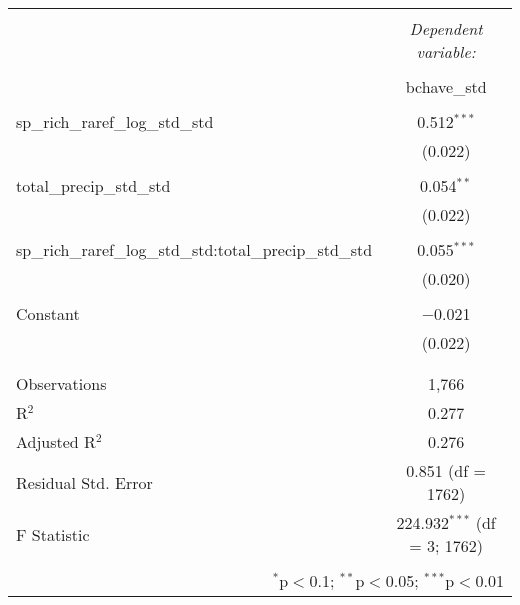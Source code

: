 
\begin{table}[!htbp] \centering 
  \caption{} 
  \label{mois_div_int_mod} 
\begin{tabular}{@{\extracolsep{5pt}}lc} 
\\[-1.8ex]\hline 
\hline \\[-1.8ex] 
 & \multicolumn{1}{c}{\textit{Dependent variable:}} \\ 
\cline{2-2} 
\\[-1.8ex] & bchave\_std \\ 
\hline \\[-1.8ex] 
 sp\_rich\_raref\_log\_std\_std & 0.512$^{***}$ \\ 
  & (0.022) \\ 
  & \\ 
 total\_precip\_std\_std & 0.054$^{**}$ \\ 
  & (0.022) \\ 
  & \\ 
 sp\_rich\_raref\_log\_std\_std:total\_precip\_std\_std & 0.055$^{***}$ \\ 
  & (0.020) \\ 
  & \\ 
 Constant & $-$0.021 \\ 
  & (0.022) \\ 
  & \\ 
\hline \\[-1.8ex] 
Observations & 1,766 \\ 
R$^{2}$ & 0.277 \\ 
Adjusted R$^{2}$ & 0.276 \\ 
Residual Std. Error & 0.851 (df = 1762) \\ 
F Statistic & 224.932$^{***}$ (df = 3; 1762) \\ 
\hline 
\hline \\[-1.8ex] 
\multicolumn{2}{r}{$^{*}$p$<$0.1; $^{**}$p$<$0.05; $^{***}$p$<$0.01} \\ 
\end{tabular} 
\end{table} 
